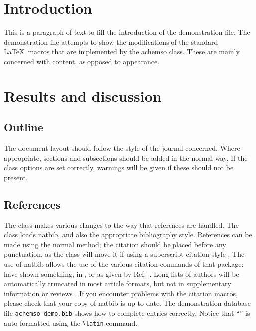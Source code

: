 \section{Introduction}
This is a paragraph of text to fill the introduction of the
demonstration file.  The demonstration file attempts to show the
modifications of the standard \LaTeX\ macros that are implemented by
the \textsf{achemso} class.  These are mainly concerned with content,
as opposed to appearance.

\section{Results and discussion}

\subsection{Outline}

The document layout should follow the style of the journal concerned.
Where appropriate, sections and subsections should be added in the
normal way. If the class options are set correctly, warnings will be
given if these should not be present.

\subsection{References}

The class makes various changes to the way that references are
handled.  The class loads \textsf{natbib}, and also the
appropriate bibliography style.  References can be made using
the normal method; the citation should be placed before any
punctuation, as the class will move it if using a superscript
citation style
\cite{Mena2000,Abernethy2003,Friedman-Hill2003,EuropeanCommission2008}.
The use of \textsf{natbib} allows the use of the various citation
commands of that package: \citeauthor{Abernethy2003} have shown
something, in \citeyear{Cotton1999}, or as given by
Ref.~.  Long lists of authors will be
automatically truncated in most article formats, but not in
supplementary information or reviews \cite{Pople2003}. If you
encounter problems with the citation macros, please check that
your copy of \textsf{natbib} is up to date. The demonstration
database file \texttt{achemso-demo.bib} shows how to complete
entries correctly. Notice that ``'' is auto-formatted
using the \texttt{\textbackslash latin} command.

